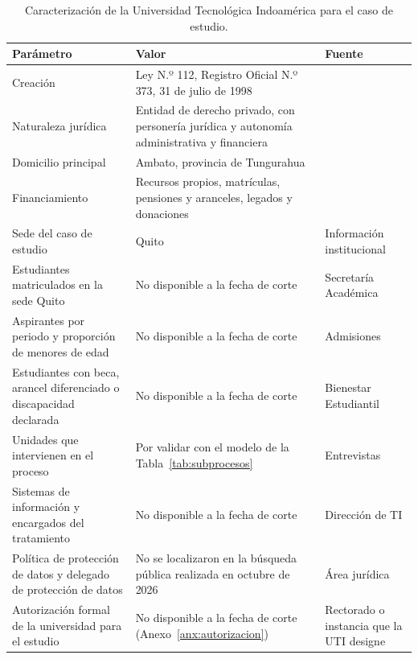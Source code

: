 \begin{table}[htbp]
  \centering
  \caption{Caracterización de la Universidad Tecnológica Indoamérica para el caso de estudio.}
  \label{tab:parametros_ies}
  \footnotesize
  \renewcommand{\arraystretch}{1.25}
  \begin{tabularx}{\textwidth}{|p{4.4cm}|L|p{3.0cm}|}
    \hline
    \textbf{Parámetro} & \textbf{Valor} & \textbf{Fuente} \\
    \hline
    Creación & Ley N.º 112, Registro Oficial N.º 373, 31 de julio de 1998 & \cite{congreso1998uti} \\
    \hline
    Naturaleza jurídica & Entidad de derecho privado, con personería jurídica y autonomía administrativa y financiera & \cite{congreso1998uti} \\
    \hline
    Domicilio principal & Ambato, provincia de Tungurahua & \cite{congreso1998uti} \\
    \hline
    Financiamiento & Recursos propios, matrículas, pensiones y aranceles, legados y donaciones & \cite{congreso1998uti} \\
    \hline
    Sede del caso de estudio & Quito & Información institucional \\
    \hline
    Estudiantes matriculados en la sede Quito & No disponible a la fecha de corte & Secretaría Académica \\
    \hline
    Aspirantes por periodo y proporción de menores de edad & No disponible a la fecha de corte & Admisiones \\
    \hline
    Estudiantes con beca, arancel diferenciado o discapacidad declarada & No disponible a la fecha de corte & Bienestar Estudiantil \\
    \hline
    Unidades que intervienen en el proceso & Por validar con el modelo de la Tabla~\ref{tab:subprocesos} & Entrevistas \\
    \hline
    Sistemas de información y encargados del tratamiento & No disponible a la fecha de corte & Dirección de TI \\
    \hline
    Política de protección de datos y delegado de protección de datos & No se localizaron en la búsqueda pública realizada en octubre de 2026 & Área jurídica \\
    \hline
    Autorización formal de la universidad para el estudio & No disponible a la fecha de corte (Anexo~\ref{anx:autorizacion}) & Rectorado o instancia que la UTI designe \\
    \hline
  \end{tabularx}
  \raggedright
\end{table}

